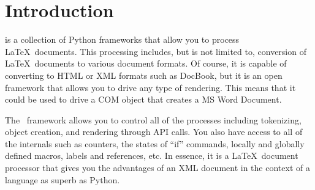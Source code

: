 
\chapter{Introduction}

\plasTeX is a collection of Python frameworks that allow you to process
\LaTeX\ documents.  This processing includes, but is not limited to,
conversion of \LaTeX\ documents to various document formats.  Of course, it is 
capable of converting to HTML or XML formats such as DocBook,
but it is an open framework that allows you to drive any type of 
rendering.  This means that it could be used to drive a COM object 
that creates a MS Word Document.

The \plasTeX\ framework allows you to control all of the 
processes including tokenizing, object creation, and rendering through 
API calls.  You also have access to all of the internals such as
counters, the states of ``if'' commands, locally and globally
defined macros, labels and references, etc.  In essence, it is a \LaTeX\
document processor that gives you the advantages of an XML
document in the context of a language as superb as Python. 

